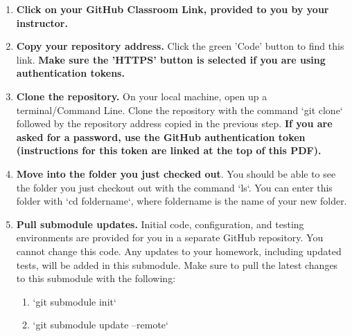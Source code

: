 \documentclass{article} %
\begin{document}

\rickroll



\begin{enumerate} 
    \item \textbf{Click on your GitHub Classroom Link, provided to you by your instructor.}
    
    \item \textbf{Copy your repository address.} Click the green 'Code' button to find this link.  \textbf{Make sure the 'HTTPS' button is selected if you are using authentication tokens.}    
    
    \item \textbf{Clone the repository.}  On your local machine, open up a terminal/Command Line.  Clone the repository with the command `git clone` followed by the repository address copied in the previous step.  \textbf{If you are asked for a password, use the GitHub authentication token (instructions for this token are linked at the top of this PDF).}
    

    \item \textbf{Move into the folder you just checked out}.  You should be able to see the folder you just checkout out with the command `ls`.  You can enter this folder with `cd foldername`, where foldername is the name of your new folder.
    
    \item \textbf{Pull submodule updates.}  Initial code, configuration, and testing environments are provided for you in a separate GitHub repository.  You cannot change this code.  Any updates to your homework, including updated tests, will be added in this submodule.  Make sure to pull the latest changes to this submodule with the following:
    \begin{enumerate}
        \item `git submodule init`
        \item `git submodule update --remote`
    \end{enumerate}
\end{enumerate}
\end{document}

